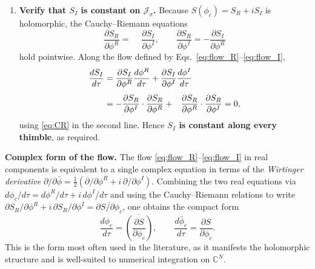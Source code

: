 \documentclass[11pt]{article}
\theoremstyle{definition}
\begin{document}
\begin{enumerate}[label=(\arabic*), leftmargin=*, itemsep=8pt]
  \item \textbf{Verify that $S_I$ is constant on $\mathcal{J}_\sigma$.}\;
        Because $S(\phi_c) = S_R + iS_I$ is holomorphic, the Cauchy--Riemann
        equations
        \begin{equation}
          \frac{\partial S_R}{\partial\phi^R}
          = \phantom{-}\frac{\partial S_I}{\partial\phi^I} ,
          \qquad
          \frac{\partial S_R}{\partial\phi^I}
          = -\frac{\partial S_I}{\partial\phi^R}
          \label{eq:CR}
        \end{equation}
        hold pointwise. Along the flow defined by
        Eqs.~\eqref{eq:flow_R}--\eqref{eq:flow_I},
        \begin{align}
          \frac{dS_I}{d\tau}
          &= \frac{\partial S_I}{\partial\phi^R}\frac{d\phi^R}{d\tau}
           + \frac{\partial S_I}{\partial\phi^I}\frac{d\phi^I}{d\tau}
            \notag\\[4pt]
          &= -\frac{\partial S_R}{\partial\phi^I}
             \cdot\frac{\partial S_R}{\partial\phi^R}
           + \phantom{-}\frac{\partial S_R}{\partial\phi^R}
             \cdot\frac{\partial S_R}{\partial\phi^I}
            = 0 ,
        \end{align}
        using \eqref{eq:CR} in the second line. Hence \textbf{$S_I$ is
        constant along every thimble}, as required.

\end{enumerate}


\textbf{Complex form of the flow.} The flow
\eqref{eq:flow_R}--\eqref{eq:flow_I} in real components is equivalent to a
single complex equation in terms of the \emph{Wirtinger derivative}
$\partial/\partial\bar\phi = \tfrac{1}{2}(\partial/\partial\phi^R +
i\,\partial/\partial\phi^I)$. Combining the two real equations via
$d\phi_c/d\tau = d\phi^R/d\tau + i\,d\phi^I/d\tau$ and using the
Cauchy--Riemann relations to write
$\partial S_R/\partial\phi^R + i\,\partial S_R/\partial\phi^I
= \overline{\partial S/\partial\phi_c}$, one obtains the compact form
\begin{equation}
  \frac{d\phi_c}{d\tau}
  = \overline{\left(\frac{\partial S}{\partial\phi_c}\right)} ,
  \qquad
  \frac{d\bar\phi_c}{d\tau}
  = \frac{\partial S}{\partial\phi_c} .
\end{equation}
This is the form most often used in the literature, as it manifests the
holomorphic structure and is well-suited to numerical integration on
$\mathbb{C}^N$.


\end{document}
